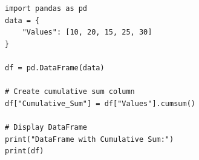 \begin{verbatim}
import pandas as pd
data = {
    "Values": [10, 20, 15, 25, 30]
}

df = pd.DataFrame(data)

# Create cumulative sum column
df["Cumulative_Sum"] = df["Values"].cumsum()

# Display DataFrame
print("DataFrame with Cumulative Sum:")
print(df)
\end{verbatim}